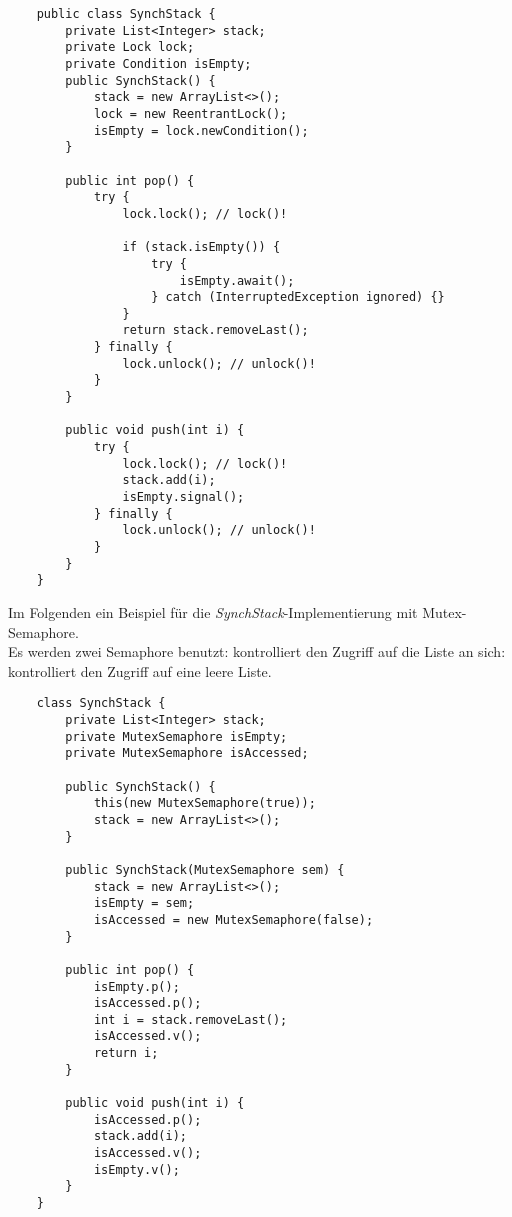 \begin{verbatim}
    public class SynchStack {
        private List<Integer> stack;
        private Lock lock;
        private Condition isEmpty;
        public SynchStack() {
            stack = new ArrayList<>();
            lock = new ReentrantLock();
            isEmpty = lock.newCondition();
        }

        public int pop() {
            try {
                lock.lock(); // lock()!

                if (stack.isEmpty()) {
                    try {
                        isEmpty.await();
                    } catch (InterruptedException ignored) {}
                }
                return stack.removeLast();
            } finally {
                lock.unlock(); // unlock()!
            }
        }

        public void push(int i) {
            try {
                lock.lock(); // lock()!
                stack.add(i);
                isEmpty.signal();
            } finally {
                lock.unlock(); // unlock()!
            }
        }
    }
\end{verbatim}

\noindent
Im Folgenden ein Beispiel für die \textit{SynchStack}-Implementierung mit Mutex-Semaphore.\\
Es werden zwei Semaphore benutzt:  kontrolliert den Zugriff auf die Liste an sich:  kontrolliert den Zugriff auf eine leere Liste.

\begin{verbatim}
    class SynchStack {
        private List<Integer> stack;
        private MutexSemaphore isEmpty;
        private MutexSemaphore isAccessed;

        public SynchStack() {
            this(new MutexSemaphore(true));
            stack = new ArrayList<>();
        }

        public SynchStack(MutexSemaphore sem) {
            stack = new ArrayList<>();
            isEmpty = sem;
            isAccessed = new MutexSemaphore(false);
        }

        public int pop() {
            isEmpty.p();
            isAccessed.p();
            int i = stack.removeLast();
            isAccessed.v();
            return i;
        }

        public void push(int i) {
            isAccessed.p();
            stack.add(i);
            isAccessed.v();
            isEmpty.v();
        }
    }
\end{verbatim}